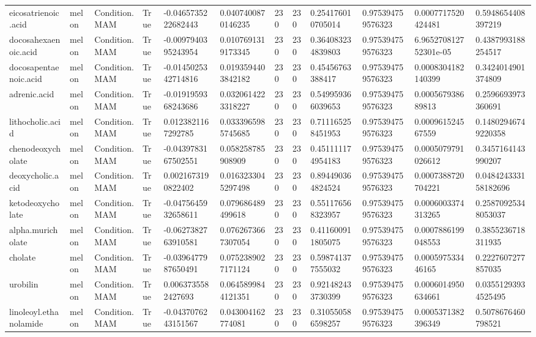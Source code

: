 \begin{longtable}{llllllllllll}
eicosatrienoic.acid & melon & Condition.MAM & True & -0.0465735222682443 & 0.0407400870146235 & 230 & 230 & 0.254176010705014 & 0.975394759576323 & 0.0007717520424481 & 0.5948654408397219 \\
docosahexaenoic.acid & melon & Condition.MAM & True & -0.0097940395243954 & 0.0107691319173345 & 230 & 230 & 0.364083234839803 & 0.975394759576323 & 6.965270812752301e-05 & 0.4387993188254517 \\
docosapentaenoic.acid & melon & Condition.MAM & True & -0.0145025342714816 & 0.0193594403842182 & 230 & 230 & 0.45456763388417 & 0.975394759576323 & 0.0008304182140399 & 0.3424014901374809 \\
adrenic.acid & melon & Condition.MAM & True & -0.0191959368243686 & 0.0320614223318227 & 230 & 230 & 0.549959366039653 & 0.975394759576323 & 0.000567938689813 & 0.2596693973360691 \\
lithocholic.acid & melon & Condition.MAM & True & 0.0123821167292785 & 0.0333965985745685 & 230 & 230 & 0.711165258451953 & 0.975394759576323 & 0.000961524567559 & 0.14802946749220358 \\
chenodeoxycholate & melon & Condition.MAM & True & -0.0439783167502551 & 0.058258785908909 & 230 & 230 & 0.451111174954183 & 0.975394759576323 & 0.0005079791026612 & 0.3457164143990207 \\
deoxycholic.acid & melon & Condition.MAM & True & 0.0021673190822402 & 0.0163233045297498 & 230 & 230 & 0.894490364824524 & 0.975394759576323 & 0.0007388720704221 & 0.048424333158182696 \\
ketodeoxycholate & melon & Condition.MAM & True & -0.0475645932658611 & 0.079686489499618 & 230 & 230 & 0.551176568323957 & 0.975394759576323 & 0.0006003374313265 & 0.25870925348053037 \\
alpha.muricholate & melon & Condition.MAM & True & -0.0627382763910581 & 0.0762673667307054 & 230 & 230 & 0.411600911805075 & 0.975394759576323 & 0.0007886199048553 & 0.3855236718311935 \\
cholate & melon & Condition.MAM & True & -0.0396477987650491 & 0.0752389027171124 & 230 & 230 & 0.598741377555032 & 0.975394759576323 & 0.000597533446165 & 0.2227607277857035 \\
urobilin & melon & Condition.MAM & True & 0.0063735582427693 & 0.0645899844121351 & 230 & 230 & 0.921482433730399 & 0.975394759576323 & 0.0006014950634661 & 0.03551293934525495 \\
linoleoyl.ethanolamide & melon & Condition.MAM & True & -0.0437076243151567 & 0.043004162774081 & 230 & 230 & 0.310550586598257 & 0.975394759576323 & 0.0005371382396349 & 0.5078676460798521 \\

\end{longtable}
